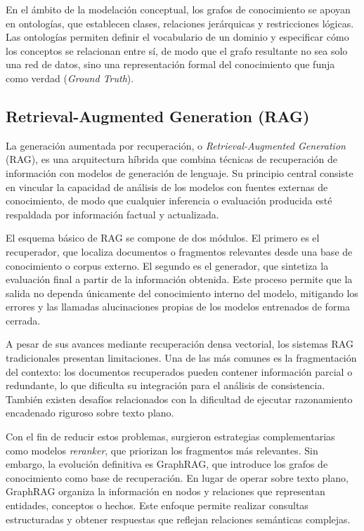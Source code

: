 \documentclass[12pt,letterpaper]{article}
\begin{document}
En el ámbito de la modelación conceptual, los grafos de conocimiento se apoyan en ontologías, que establecen clases, relaciones jerárquicas y restricciones lógicas. Las ontologías permiten definir el vocabulario de un dominio y especificar cómo los conceptos se relacionan entre sí, de modo que el grafo resultante no sea solo una red de datos, sino una representación formal del conocimiento que funja como verdad (\textit{Ground Truth}).


\subsection{Retrieval-Augmented Generation (RAG)}

La generación aumentada por recuperación, o \textit{Retrieval-Augmented Generation} (RAG), es una arquitectura híbrida que combina técnicas de recuperación de información con modelos de generación de lenguaje. Su principio central consiste en vincular la capacidad de análisis de los modelos con fuentes externas de conocimiento, de modo que cualquier inferencia o evaluación producida esté respaldada por información factual y actualizada.

El esquema básico de RAG se compone de dos módulos. El primero es el recuperador, que localiza documentos o fragmentos relevantes desde una base de conocimiento o corpus externo. El segundo es el generador, que sintetiza la evaluación final a partir de la información obtenida. Este proceso permite que la salida no dependa únicamente del conocimiento interno del modelo, mitigando los errores y las llamadas alucinaciones propias de los modelos entrenados de forma cerrada.

A pesar de sus avances mediante recuperación densa vectorial, los sistemas RAG tradicionales presentan limitaciones. Una de las más comunes es la fragmentación del contexto: los documentos recuperados pueden contener información parcial o redundante, lo que dificulta su integración para el análisis de consistencia. También existen desafíos relacionados con la dificultad de ejecutar razonamiento encadenado riguroso sobre texto plano.

Con el fin de reducir estos problemas, surgieron estrategias complementarias como modelos \textit{reranker}, que priorizan los fragmentos más relevantes. Sin embargo, la evolución definitiva es GraphRAG, que introduce los grafos de conocimiento como base de recuperación. En lugar de operar sobre texto plano, GraphRAG organiza la información en nodos y relaciones que representan entidades, conceptos o hechos. Este enfoque permite realizar consultas estructuradas y obtener respuestas que reflejan relaciones semánticas complejas.
\end{document}
